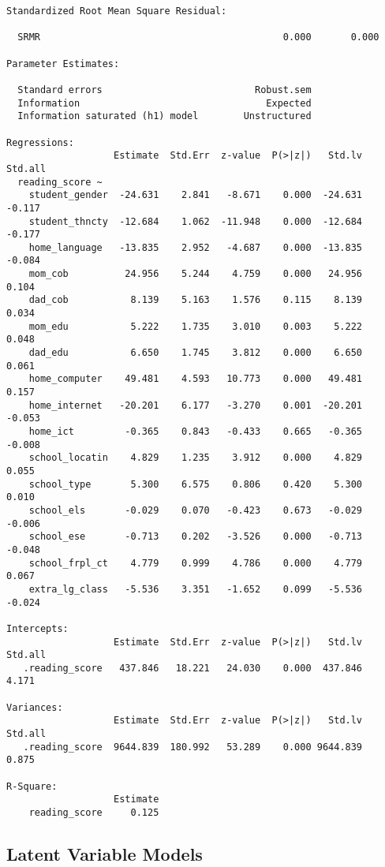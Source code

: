 \documentclass[
]{article}
\begin{document}
\begin{verbatim}
Standardized Root Mean Square Residual:

  SRMR                                           0.000       0.000

Parameter Estimates:

  Standard errors                           Robust.sem
  Information                                 Expected
  Information saturated (h1) model        Unstructured

Regressions:
                   Estimate  Std.Err  z-value  P(>|z|)   Std.lv  Std.all
  reading_score ~                                                       
    student_gender  -24.631    2.841   -8.671    0.000  -24.631   -0.117
    student_thncty  -12.684    1.062  -11.948    0.000  -12.684   -0.177
    home_language   -13.835    2.952   -4.687    0.000  -13.835   -0.084
    mom_cob          24.956    5.244    4.759    0.000   24.956    0.104
    dad_cob           8.139    5.163    1.576    0.115    8.139    0.034
    mom_edu           5.222    1.735    3.010    0.003    5.222    0.048
    dad_edu           6.650    1.745    3.812    0.000    6.650    0.061
    home_computer    49.481    4.593   10.773    0.000   49.481    0.157
    home_internet   -20.201    6.177   -3.270    0.001  -20.201   -0.053
    home_ict         -0.365    0.843   -0.433    0.665   -0.365   -0.008
    school_locatin    4.829    1.235    3.912    0.000    4.829    0.055
    school_type       5.300    6.575    0.806    0.420    5.300    0.010
    school_els       -0.029    0.070   -0.423    0.673   -0.029   -0.006
    school_ese       -0.713    0.202   -3.526    0.000   -0.713   -0.048
    school_frpl_ct    4.779    0.999    4.786    0.000    4.779    0.067
    extra_lg_class   -5.536    3.351   -1.652    0.099   -5.536   -0.024

Intercepts:
                   Estimate  Std.Err  z-value  P(>|z|)   Std.lv  Std.all
   .reading_score   437.846   18.221   24.030    0.000  437.846    4.171

Variances:
                   Estimate  Std.Err  z-value  P(>|z|)   Std.lv  Std.all
   .reading_score  9644.839  180.992   53.289    0.000 9644.839    0.875

R-Square:
                   Estimate
    reading_score     0.125
\end{verbatim}

\hypertarget{latent-variable-models}{%
\subsection{Latent Variable Models}\label{latent-variable-models}}
\end{document}
